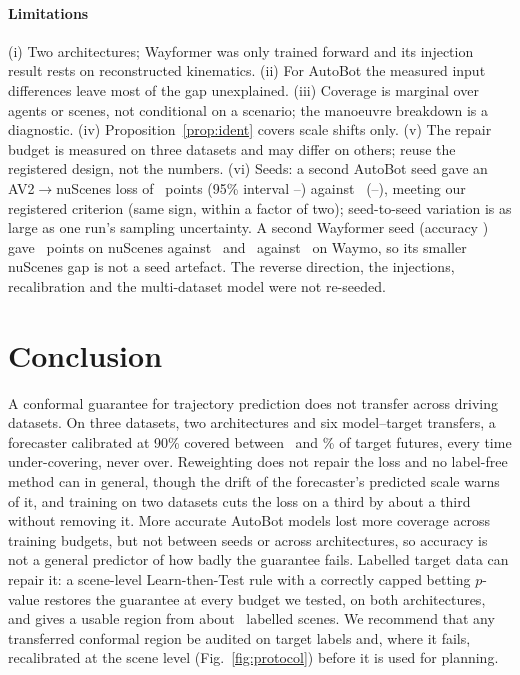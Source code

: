 \paragraph{Limitations} (i) Two architectures; Wayformer was only trained forward and its injection result rests on
reconstructed kinematics. (ii) For AutoBot the measured input differences leave most of the gap unexplained. (iii) Coverage is
marginal over agents or scenes, not conditional on a scenario; the manoeuvre breakdown is a diagnostic. (iv)
Proposition~\ref{prop:ident} covers scale shifts only. (v) The repair budget is measured on three datasets and may differ on
others; reuse the registered design, not the numbers. (vi) Seeds: a second AutoBot seed gave an AV2$\to$nuScenes loss of
\seedGapOne\ points (95\% interval \seedCiLo--\seedCiHi) against \seedGapZero\ (\seedZeroCiLo--\seedZeroCiHi), meeting our
registered criterion (same sign, within a factor of two); seed-to-seed variation is as large as one run's sampling
uncertainty. A second Wayformer seed (accuracy \wfSeedAde) gave \wfSeedGapOne\ points on nuScenes against \wfSeedGapZero\ and
\wfSeedWmOne\ against \wfSeedWmZero\ on Waymo, so its smaller nuScenes gap is not a seed artefact. The reverse direction,
the injections, recalibration and the multi-dataset model were not re-seeded.

\section{Conclusion}
A conformal guarantee for trajectory prediction does not transfer across driving datasets. On three datasets, two
architectures and six model--target transfers, a forecaster calibrated at 90\% covered between \covTgtMin\ and
\covTgtMax\% of target futures, every time under-covering, never over. Reweighting does not repair the loss and no
label-free method can in general, though the drift of the forecaster's predicted scale warns of it, and training on
two datasets cuts the loss on a third by about a third without removing it. More accurate AutoBot models lost more coverage across training budgets, but not
between seeds or across architectures, so accuracy is not a general predictor of how badly the guarantee fails.
Labelled target data can repair it: a scene-level Learn-then-Test rule with a correctly capped betting $p$-value
restores the guarantee at every budget we tested, on both architectures, and gives a usable region from about
\recMMin\ labelled scenes. We recommend that any transferred conformal region be audited on target labels and, where it
fails, recalibrated at the scene level (Fig.~\ref{fig:protocol}) before it is used for planning.
